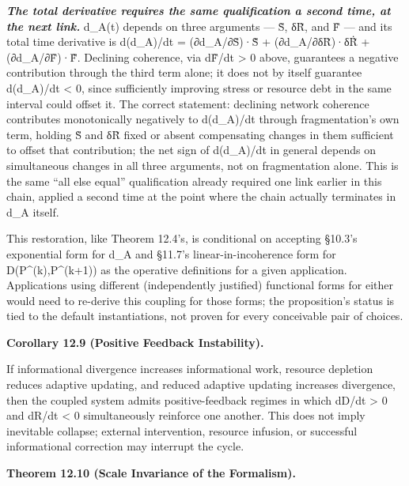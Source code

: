 \documentclass[
]{article}
\begin{document}
\emph{\textbf{The total derivative requires the same qualification a
second time, at the next link.}} d\_A(t) depends on three arguments ---
S̃, δR̃, and F̃ --- and its total time derivative is d(d\_A)/dt =
(∂d\_A/∂S̃)·Ṡ̃ + (∂d\_A/∂δR̃)·δṘ̃ + (∂d\_A/∂F̃)·F̃̇. Declining coherence, via
dF̃/dt \textgreater{} 0 above, guarantees a negative contribution through
the third term alone; it does not by itself guarantee d(d\_A)/dt
\textless{} 0, since sufficiently improving stress or resource debt in
the same interval could offset it. The correct statement: declining
network coherence contributes monotonically negatively to d(d\_A)/dt
through fragmentation's own term, holding S̃ and δR̃ fixed or absent
compensating changes in them sufficient to offset that contribution; the
net sign of d(d\_A)/dt in general depends on simultaneous changes in all
three arguments, not on fragmentation alone. This is the same ``all else
equal'' qualification already required one link earlier in this chain,
applied a second time at the point where the chain actually terminates
in d\_A itself.

This restoration, like Theorem 12.4's, is conditional on accepting
§10.3's exponential form for d\_A and §11.7's linear-in-incoherence form
for D(P\^{}(k),P\^{}(k+1)) as the operative definitions for a given
application. Applications using different (independently justified)
functional forms for either would need to re-derive this coupling for
those forms; the proposition's status is tied to the default
instantiations, not proven for every conceivable pair of choices.

\textbf{Corollary 12.9 (Positive Feedback Instability).}

If informational divergence increases informational work, resource
depletion reduces adaptive updating, and reduced adaptive updating
increases divergence, then the coupled system admits positive-feedback
regimes in which dD/dt \textgreater{} 0 and dR/dt \textless{} 0
simultaneously reinforce one another. This does not imply inevitable
collapse; external intervention, resource infusion, or successful
informational correction may interrupt the cycle.

\textbf{Theorem 12.10 (Scale Invariance of the Formalism).}
\end{document}
